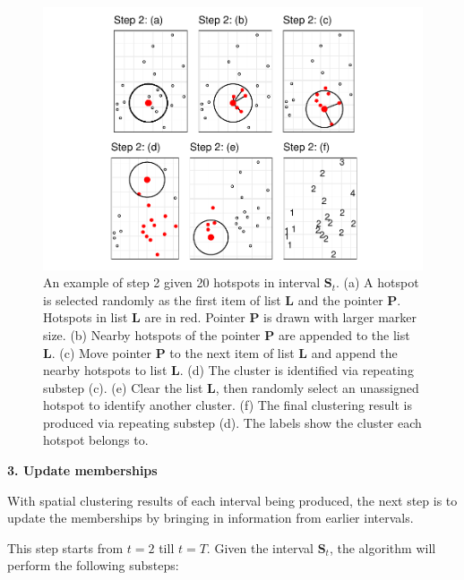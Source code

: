 \begin{Schunk}
\begin{figure}

{\centering \includegraphics[width=0.8\linewidth]{clustering_paper_files/figure-latex/step2figs-1} 

}

\caption{An example of step 2 given 20 hotspots in interval $\boldsymbol{S}_t$. (a) A hotspot is selected randomly as the first item of list $\boldsymbol{L}$ and the pointer $\boldsymbol{P}$. Hotspots in list $\boldsymbol{L}$ are in red. Pointer $\boldsymbol{P}$ is drawn with larger marker size. (b) Nearby hotspots of the pointer $\boldsymbol{P}$ are appended to the list $\boldsymbol{L}$. (c) Move pointer $\boldsymbol{P}$ to the next item of list $\boldsymbol{L}$ and append the nearby hotspots to list $\boldsymbol{L}$. (d) The cluster is identified via repeating substep (c). (e) Clear the list $\boldsymbol{L}$, then randomly select an unassigned hotspot to identify another cluster. (f) The final clustering result is produced via repeating substep (d). The labels show the cluster each hotspot belongs to.}\label{fig:step2figs}
\end{figure}
\end{Schunk}

\textbf{3. Update memberships}

With spatial clustering results of each interval being produced, the
next step is to update the memberships by bringing in information from
earlier intervals.

This step starts from \(t=2\) till \(t=T\). Given the interval
\(\boldsymbol{S}_t\), the algorithm will perform the following substeps:

